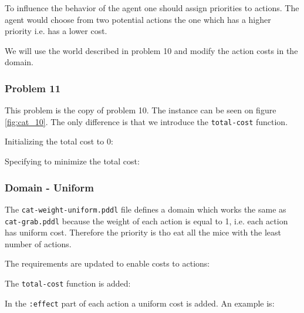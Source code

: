To influence the behavior of the agent one should assign priorities to actions. The agent would choose from two potential actions the one which has a higher priority i.e. has a lower cost.

We will use the world described in problem 10 and modify the action costs in the domain.

\subsubsection{Problem 11}

This problem is the copy of problem 10. The instance can be seen on figure \ref{fig:cat_10}. The only difference is that we introduce the \verb|total-cost| function.

Initializing the total cost to 0:

 

Specifying to minimize the total cost:

 


\subsubsection{Domain - Uniform}

The \verb|cat-weight-uniform.pddl| file defines a domain which works the same as \verb|cat-grab.pddl| because the weight of each action is equal to 1, i.e. each action has uniform cost. Therefore the priority is tho eat all the mice with the least number of actions.

The requirements are updated to enable costs to actions:

 

The \verb|total-cost| function is added:

 

In the \verb|:effect| part of each action a uniform cost is added. An example is:

 


